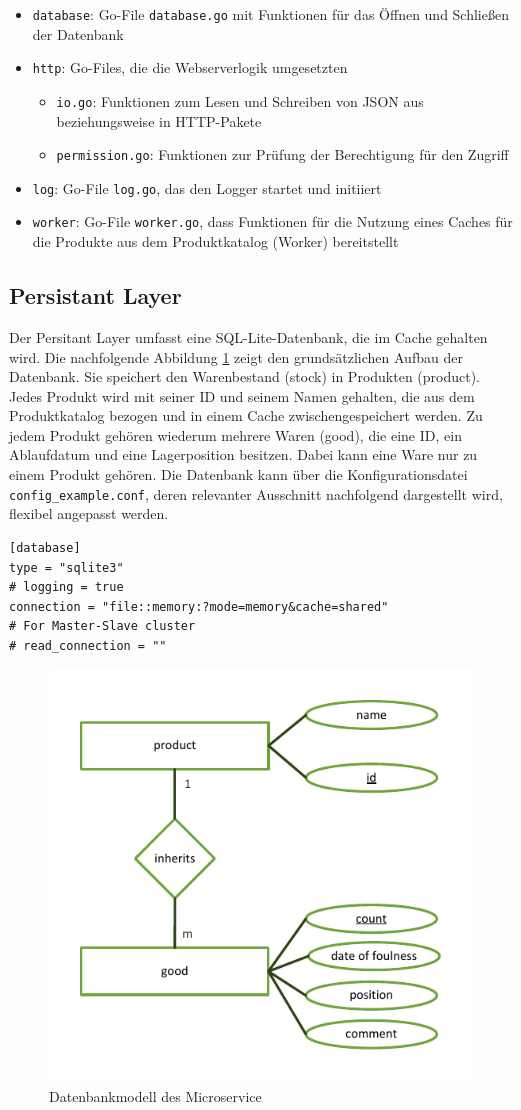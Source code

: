 	\begin{itemize}
	\item \texttt{database}: Go-File \texttt{database.go} mit Funktionen für das Öffnen und Schließen der Datenbank
	\item \texttt{http}: Go-Files, die die Webserverlogik umgesetzten
		\begin{itemize}
		\item \texttt{io.go}: Funktionen zum Lesen und Schreiben von JSON aus beziehungsweise in HTTP-Pakete
		\item \texttt{permission.go}: Funktionen zur Prüfung der Berechtigung für den Zugriff
		\end{itemize}	
	\item \texttt{log}: Go-File \texttt{log.go}, das den Logger startet und initiiert
	\item \texttt{worker}: Go-File \texttt{worker.go}, dass Funktionen für die Nutzung eines Caches für die Produkte aus dem Produktkatalog (Worker) bereitstellt 
	\end{itemize}


\subsection{Persistant Layer}
Der Persitant Layer umfasst eine SQL-Lite-Datenbank, die im Cache gehalten wird. Die nachfolgende Abbildung \ref{pic:Datenbankmodell des Microservice} zeigt den grundsätzlichen Aufbau der Datenbank. Sie speichert den Warenbestand (stock) in Produkten (product). Jedes Produkt wird mit seiner ID und seinem Namen gehalten, die aus dem Produktkatalog bezogen und in einem Cache zwischengespeichert werden. Zu jedem Produkt gehören wiederum mehrere Waren (good), die eine ID, ein Ablaufdatum und eine Lagerposition besitzen. Dabei kann eine Ware nur zu einem Produkt gehören. Die Datenbank kann über die Konfigurationsdatei \texttt{config\_example.conf}, deren relevanter Ausschnitt nachfolgend dargestellt wird, flexibel angepasst werden.


\begin{lstlisting}[caption=Datenbankeinstellungen in der Konfigurationsdatei]
[database]
type = "sqlite3"
# logging = true
connection = "file::memory:?mode=memory&cache=shared"
# For Master-Slave cluster
# read_connection = ""
\end{lstlisting}

\begin{figure}[H]
	\centering
	\includegraphics[width=0.45 \textwidth]{./pics/db.pdf}
	\caption{Datenbankmodell des Microservice}
	\label{pic:Datenbankmodell des Microservice}
\end{figure}

